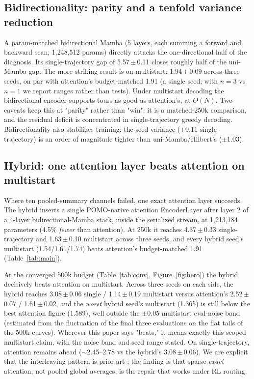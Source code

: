 \documentclass[11pt]{article}
\newcommand{\pct}{\%}
\begin{document}
\subsection{Bidirectionality: parity and a tenfold variance reduction}
A param-matched bidirectional Mamba (5 layers, each summing a forward and backward
scan; 1{,}248{,}512 params) directly attacks the one-directional half of the
diagnosis. Its single-trajectory gap of 5.57\,$\pm$\,0.11 closes roughly half of
the uni-Mamba gap. The more striking result is on multistart: 1.94\,$\pm$\,0.09
across three seeds, on par with attention's budget-matched 1.91 (a single seed;
with $n{=}3$ vs $n{=}1$ we report ranges rather than tests).
Under multistart decoding the bidirectional encoder supports tours as good as
attention's, at $O(N)$. Two caveats keep this at "parity" rather than "win": it is
a matched-250k comparison, and the residual deficit is concentrated in
single-trajectory greedy decoding. Bidirectionality also stabilizes training: the
seed variance ($\pm$0.11 single-trajectory) is an order of magnitude tighter than
uni-Mamba/Hilbert's ($\pm$1.03).

\subsection{Hybrid: one attention layer beats attention on multistart}
Where ten pooled-summary channels failed, one exact attention layer succeeds. The
hybrid inserts a single POMO-native attention EncoderLayer after layer 2 of a
4-layer bidirectional-Mamba stack, inside the serialized stream, at 1{,}213{,}184
parameters (4.5\pct{} \emph{fewer} than attention). At 250k it reaches
4.37\,$\pm$\,0.33 single-trajectory and 1.63\,$\pm$\,0.10 multistart across three
seeds, and every hybrid seed's multistart (1.54/1.61/1.74) beats attention's
budget-matched 1.91 (Table~\ref{tab:main}).

At the converged 500k budget (Table~\ref{tab:conv}, Figure~\ref{fig:hero}) the
hybrid decisively beats attention on multistart. Across three seeds on each
side, the hybrid reaches 3.08\,$\pm$\,0.06 single / 1.14\,$\pm$\,0.19 multistart
versus attention's 2.52\,$\pm$\,0.07 / 1.61\,$\pm$\,0.02, and the
\emph{worst} hybrid seed's multistart (1.365) is still below the best attention
figure (1.589), well outside the $\pm$0.05 multistart eval-noise band (estimated
from the fluctuation of the final three evaluations on the flat tails of the
500k curves). Wherever this paper says "beats," it means exactly this scoped
multistart claim, with the noise band and seed range stated. On single-trajectory, attention remains
ahead ($\sim$2.45--2.78 vs the hybrid's 3.08\,$\pm$\,0.06). We are explicit that
the interleaving pattern is prior art \citep{jamba2024,zamba2024}; the finding is
that sparse \emph{exact} attention, not pooled global averages, is the repair that
works under RL routing.
\end{document}
